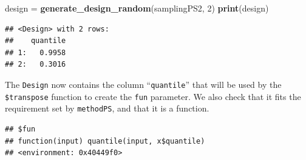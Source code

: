 \documentclass[]{scrbook}
\newenvironment{Shaded}{\begin{snugshade}}{\end{snugshade}}
\newcommand{\CommentTok}[1]{\textcolor[rgb]{0.56,0.35,0.01}{\textit{#1}}}
\newcommand{\ControlFlowTok}[1]{\textcolor[rgb]{0.13,0.29,0.53}{\textbf{#1}}}
\newcommand{\DataTypeTok}[1]{\textcolor[rgb]{0.13,0.29,0.53}{#1}}
\newcommand{\DecValTok}[1]{\textcolor[rgb]{0.00,0.00,0.81}{#1}}
\newcommand{\KeywordTok}[1]{\textcolor[rgb]{0.13,0.29,0.53}{\textbf{#1}}}
\newcommand{\NormalTok}[1]{#1}
\newcommand{\OperatorTok}[1]{\textcolor[rgb]{0.81,0.36,0.00}{\textbf{#1}}}
\newcommand{\StringTok}[1]{\textcolor[rgb]{0.31,0.60,0.02}{#1}}
\renewenvironment{Shaded} {\begin{snugshade}\small} {\end{snugshade}}
\begin{document}
\begin{Shaded}
\end{Shaded}

\begin{Shaded}
\begin{Highlighting}[]
\NormalTok{design =}\StringTok{ }\KeywordTok{generate_design_random}\NormalTok{(samplingPS2, }\DecValTok{2}\NormalTok{)}
\KeywordTok{print}\NormalTok{(design)}
\end{Highlighting}
\end{Shaded}

\begin{verbatim}
## <Design> with 2 rows:
##    quantile
## 1:   0.9958
## 2:   0.3016
\end{verbatim}

The \texttt{Design} now contains the column ``\texttt{quantile}'' that will be used by the \texttt{\$transpose} function to create the \texttt{fun} parameter.
We also check that it fits the requirement set by \texttt{methodPS}, and that it is a function.

\begin{Shaded}
\end{Shaded}

\begin{verbatim}
## $fun
## function(input) quantile(input, x$quantile)
## <environment: 0x40449f0>
\end{verbatim}
\end{document}
